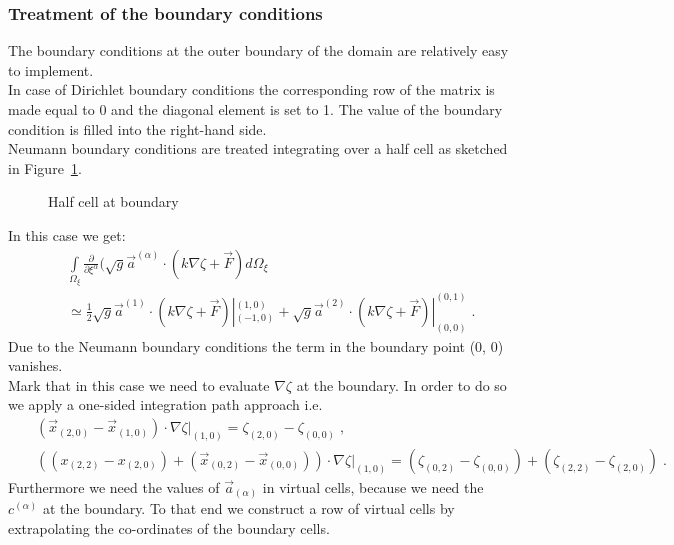 \documentclass[12pt]{book}
\begin{document}
\subsubsection{Treatment of the boundary conditions}
\label{subsec1.3G}
%
The boundary conditions at the outer boundary of the domain are relatively
easy to implement.\\[2ex]
In case of Dirichlet boundary conditions the corresponding row of the
matrix is made equal to 0 and the diagonal element is set to 1. The value
of the boundary condition is filled into the right-hand side.\\[2ex]
Neumann boundary conditions are treated integrating over a half cell as
sketched in Figure~\ref{fig2G}.
\begin{figure}[htb]
\centerline{}
\caption{Half cell at boundary}
\label{fig2G}
\end{figure}
In this case we get:
\begin{eqnarray}
&&\int\limits_{\Omega_{\xi}}\frac{\partial}{\partial
\xi^{\alpha}}(\sqrt{g}\vec{a}^{(\alpha)} \cdot (k \nabla \zeta +
\vec{F})d\Omega_{\xi}\nonumber\\
&&\simeq\frac{1}{2}\sqrt{g}\vec{a}^{(1)} \cdot (k \nabla \zeta +
\vec{F})|^{(1,0)}_{(-1,0)} + \sqrt{g}\vec{a}^{(2)} \cdot (k \nabla \zeta +
\vec{F})|^{(0,1)}_{(0,0)}\;.
\label{eq:17G}
\end{eqnarray}
Due to the Neumann boundary conditions the term in the boundary point (0,
0) vanishes.\\[2ex]
Mark that in this case we need to evaluate $\nabla \zeta$ at the boundary.
In order to do so we apply a one-sided integration path approach i.e.
\begin{eqnarray}
&&(\vec{x}_{(2,0)} - \vec{x}_{(1,0)}) \cdot \nabla \zeta |_{(1,0)} =
\zeta_{(2,0)} - \zeta _{(0,0)}\;,\nonumber\\
&&((x_{(2,2)} - x_{(2,0)}) + (\vec{x}_{(0,2)} - \vec{x}_{(0,0)})) \cdot
\nabla \zeta |_{(1,0)} = (\zeta_{(0,2)} - \zeta_{(0,0)}) + (\zeta_{(2,2)} -
\zeta_{(2,0)})\;.
\label{eq:18G}
\end{eqnarray}
Furthermore we need the values of $\vec{a}_{(\alpha)}$ in virtual cells,
because we need the $c^{(\alpha)}$ at the boundary. To that end we
construct a row of virtual cells by extrapolating the co-ordinates of the
boundary cells.
%
\end{document}

